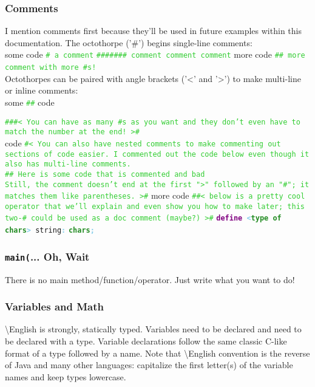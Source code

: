 \documentclass{article}
\newcommand{\name}{\textbackslash{}English}				%
\newcommand{\comment}[1]{\texttt{\textcolor{LimeGreen}{#1}}}
\newcommand{\type}[1]{\texttt{\textcolor{ForestGreen}{\textbf{#1}}}}
\newcommand{\keyop}[1]{\texttt{\textcolor{Purple}{\textbf{#1}}}}
\newcommand{\defpunct}[1]{\texttt{\textcolor{SkyBlue}{\textbf{#1}}}}
\newcommand{\define}[2]{\texttt{\keyop{define} \defpunct{<}#1\defpunct{>} #2\defpunct{:}}}
\newenvironment{code}[0]
{\ttfamily{}				%
\setlength\parindent{0cm}	%
~\\}
{\setlength\parindent{1cm}
~\\}
\begin{document}
\subsubsection{Comments}
\indent I mention comments first because they'll be used in future examples within this documentation.
\indent The octothorpe ('\#') begins single-line comments:
\begin{code}
some code		\comment{\# a comment}
\comment{\#\#\#\#\#\#\# comment comment comment}
more code		\comment{\#\# more comment with more \#s!}
\end{code}
\indent Octothorpes can be paired with angle brackets ('<' and '>') to make multi-line or inline comments:
\begin{code}
some \comment{\#< awesome >\#} code

\comment{\#\#\#< You can have as many \#s as you want and they don't
even have to match the number at the end! >\#\\}
code
\comment{\#< You can also have nested comments to make commenting out sections of code easier. 
I commented out the code below even though it also has multi-line comments.\\

\#< This is a comment >\# Here is some code that is commented and bad\\

Still, the comment doesn't end at the first ">" followed by an "\#"; it matches them like parentheses. 
>\#}
more code
\comment{\#\#< below is a pretty cool operator that we'll explain and even show you how to make later; this two-\# could be used as a doc comment (maybe?) >\#}
\define{\type{type of chars}}{string}
\qquad\type{chars}\defpunct{;}
\end{code}

\subsubsection{\texttt{main(}... Oh, Wait}
\indent There is no main method/function/operator. Just write what you want to do!

\subsubsection{Variables and Math}
\indent \name{} is strongly, statically typed. Variables need to be declared and need to be declared with a type. Variable declarations follow the same classic C-like format of a type followed by a name. Note that \name{} convention is the reverse of Java and many other languages: capitalize the first letter(s) of the variable names and keep types lowercase.
\end{document}
